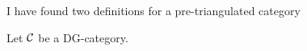 I have found two definitions for a pre-triangulated category

\begin{definition}
    Let \( {\mathcal{C}} \) be a DG-category.
\end{definition}